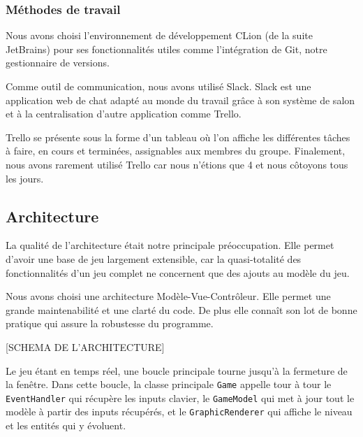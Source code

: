 \documentclass[a4paper,11pt]{article}
\begin{document}
\subsubsection*{Méthodes de travail}
Nous avons choisi l'environnement de développement CLion (de la suite JetBrains) pour ses fonctionnalités utiles comme l'intégration de Git, notre gestionnaire de versions.

Comme outil de communication, nous avons utilisé Slack. Slack est une application web de chat adapté au monde du travail grâce à son système de salon et à la centralisation d'autre application comme Trello.

Trello se présente sous la forme d'un tableau où l'on affiche les différentes tâches à faire, en cours et terminées, assignables aux membres du groupe.
Finalement, nous avons rarement utilisé Trello car nous n'étions que 4 et nous côtoyons tous les jours.

\subsection{Architecture}
La qualité de l'architecture était notre principale préoccupation. Elle permet d'avoir une base de jeu largement extensible, car la quasi-totalité des fonctionnalités d'un jeu complet ne concernent que des ajouts au modèle du jeu.

Nous avons choisi une architecture Modèle-Vue-Contrôleur. Elle permet une grande maintenabilité et une clarté du code. De plus elle connaît son lot de bonne pratique qui assure la robustesse du programme.

[SCHEMA DE L'ARCHITECTURE]

Le jeu étant en temps réel, une boucle principale tourne jusqu'à la fermeture de la fenêtre. Dans cette boucle, la classe principale \texttt{Game} appelle tour à tour le \texttt{EventHandler} qui récupère les inputs clavier, le \texttt{GameModel} qui met à jour tout le modèle à partir des inputs récupérés, et le \texttt{GraphicRenderer} qui affiche le niveau et les entités qui y évoluent.
\end{document}
